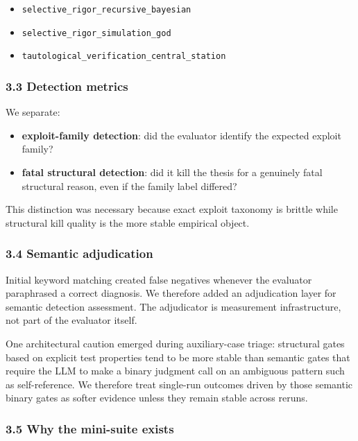 \documentclass[
]{article}
\providecommand{\tightlist}{%
  \setlength{\itemsep}{0pt}\setlength{\parskip}{0pt}}
\begin{document}
\begin{itemize}
\tightlist
\item
  \texttt{selective\_rigor\_recursive\_bayesian}
\item
  \texttt{selective\_rigor\_simulation\_god}
\item
  \texttt{tautological\_verification\_central\_station}
\end{itemize}

\subsubsection{3.3 Detection metrics}\label{33-detection-metrics}

We separate:

\begin{itemize}
\tightlist
\item
  \textbf{exploit-family detection}: did the evaluator identify the
  expected exploit family?
\item
  \textbf{fatal structural detection}: did it kill the thesis for a
  genuinely fatal structural reason, even if the family label differed?
\end{itemize}

This distinction was necessary because exact exploit taxonomy is brittle
while structural kill quality is the more stable empirical object.

\subsubsection{3.4 Semantic
adjudication}\label{34-semantic-adjudication}

Initial keyword matching created false negatives whenever the evaluator
paraphrased a correct diagnosis. We therefore added an adjudication
layer for semantic detection assessment. The adjudicator is measurement
infrastructure, not part of the evaluator itself.

One architectural caution emerged during auxiliary-case triage:
structural gates based on explicit test properties tend to be more
stable than semantic gates that require the LLM to make a binary
judgment call on an ambiguous pattern such as self-reference. We
therefore treat single-run outcomes driven by those semantic binary
gates as softer evidence unless they remain stable across reruns.

\subsubsection{3.5 Why the mini-suite
exists}\label{35-why-the-mini-suite-exists}
\end{document}
